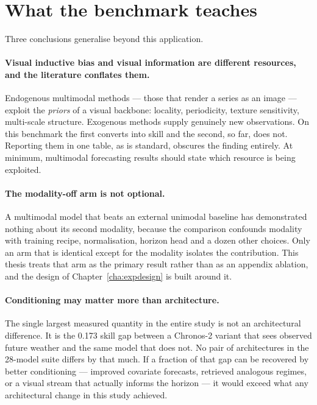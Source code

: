 \section{What the benchmark teaches}
\label{sec:lessons}

Three conclusions generalise beyond this application.

\paragraph{Visual inductive bias and visual information are different resources, and the
literature conflates them.} Endogenous multimodal methods --- those that render a series as
an image --- exploit the \emph{priors} of a visual backbone: locality, periodicity, texture
sensitivity, multi-scale structure. Exogenous methods supply genuinely new observations. On
this benchmark the first converts into skill and the second, so far, does not. Reporting them
in one table, as is standard, obscures the finding entirely. At minimum, multimodal
forecasting results should state which resource is being exploited.

\paragraph{The modality-off arm is not optional.} A multimodal model that beats an external
unimodal baseline has demonstrated nothing about its second modality, because the comparison
confounds modality with training recipe, normalisation, horizon head and a dozen other
choices. Only an arm that is identical except for the modality isolates the contribution.
This thesis treats that arm as the primary result rather than as an appendix ablation, and
the design of Chapter~\ref{cha:expdesign} is built around it.

\paragraph{Conditioning may matter more than architecture.} The single largest measured
quantity in the entire study is not an architectural difference. It is the 0.173 skill gap
between a Chronos-2 variant that sees observed future weather and the same model that does
not. No pair of architectures in the 28-model suite differs by that much. If a fraction of
that gap can be recovered by better conditioning --- improved covariate forecasts, retrieved
analogous regimes, or a visual stream that actually informs the horizon --- it would exceed
what any architectural change in this study achieved.

